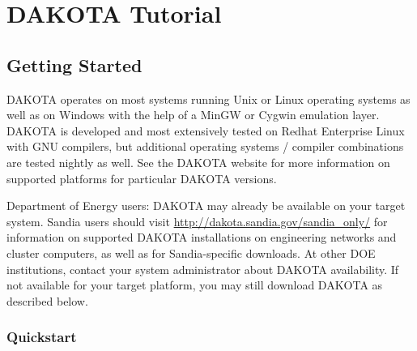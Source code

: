 \chapter{DAKOTA Tutorial}\label{tutorial}

\section{Getting Started}\label{tutorial:installation}

DAKOTA operates on most systems running Unix or Linux operating
systems as well as on Windows with the help of a MinGW or Cygwin
emulation layer.  DAKOTA is developed and most extensively tested on
Redhat Enterprise Linux with GNU compilers, but additional operating
systems / compiler combinations are tested nightly as well.  See the
DAKOTA website for more information on supported platforms for
particular DAKOTA versions.

Department of Energy users: DAKOTA may already be available on your
target system. Sandia users should visit
\url{http://dakota.sandia.gov/sandia_only/} for information on
supported DAKOTA installations on engineering networks and cluster
computers, as well as for Sandia-specific downloads.  At other DOE
institutions, contact your system administrator about DAKOTA
availability.  If not available for your target platform, you may
still download DAKOTA as described below.

\subsection {Quickstart}\label{tutorial:installation:quickstart}

